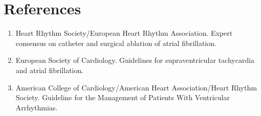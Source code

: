 \section*{References}
\begin{enumerate}
\item Heart Rhythm Society/European Heart Rhythm Association. Expert consensus on catheter and surgical ablation of atrial fibrillation.
\item European Society of Cardiology. Guidelines for supraventricular tachycardia and atrial fibrillation.
\item American College of Cardiology/American Heart Association/Heart Rhythm Society. Guideline for the Management of Patients With Ventricular Arrhythmias.
\end{enumerate}
